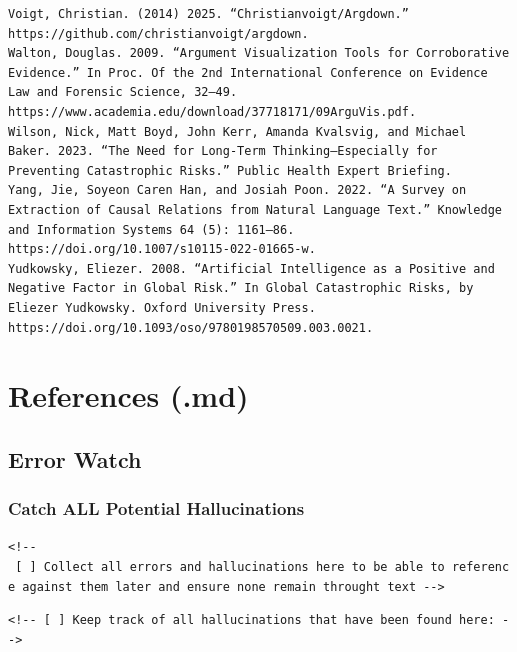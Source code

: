 \documentclass[
  11pt,
  letterpaper,
]{book}
\begin{document}
\begin{verbatim}
Voigt, Christian. (2014) 2025. “Christianvoigt/Argdown.” https://github.com/christianvoigt/argdown.
Walton, Douglas. 2009. “Argument Visualization Tools for Corroborative Evidence.” In Proc. Of the 2nd International Conference on Evidence Law and Forensic Science, 32–49. https://www.academia.edu/download/37718171/09ArguVis.pdf.
Wilson, Nick, Matt Boyd, John Kerr, Amanda Kvalsvig, and Michael Baker. 2023. “The Need for Long-Term Thinking–Especially for Preventing Catastrophic Risks.” Public Health Expert Briefing.
Yang, Jie, Soyeon Caren Han, and Josiah Poon. 2022. “A Survey on Extraction of Causal Relations from Natural Language Text.” Knowledge and Information Systems 64 (5): 1161–86. https://doi.org/10.1007/s10115-022-01665-w.
Yudkowsky, Eliezer. 2008. “Artificial Intelligence as a Positive and Negative Factor in Global Risk.” In Global Catastrophic Risks, by Eliezer Yudkowsky. Oxford University Press. https://doi.org/10.1093/oso/9780198570509.003.0021.
\end{verbatim}


\chapter{References (.md)}\label{references-.md}

\section{Error Watch}\label{error-watch}

\subsection{Catch ALL Potential
Hallucinations}\label{catch-all-potential-hallucinations}

\texttt{\textless{}!-\/-\ {[}\ {]}\ Collect\ all\ errors\ and\ hallucinations\ here\ to\ be\ able\ to\ reference\ against\ them\ later\ and\ ensure\ none\ remain\ throught\ text\ -\/-\textgreater{}}

\texttt{\textless{}!-\/-\ {[}\ {]}\ Keep\ track\ of\ all\ hallucinations\ that\ have\ been\ found\ here:\ -\/-\textgreater{}}
\end{document}

